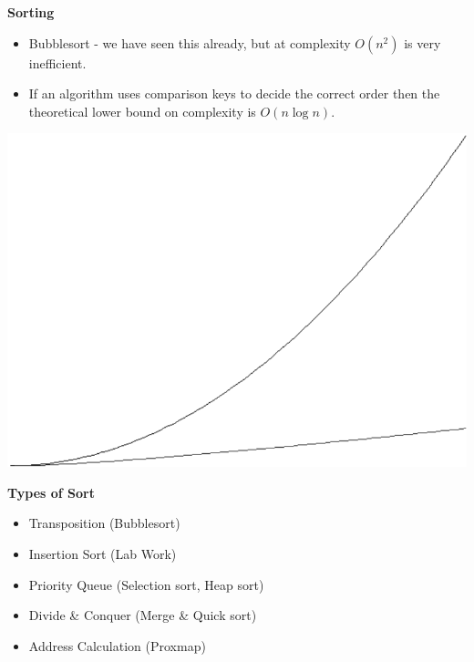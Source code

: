 \documentclass[a4,portraitt]{slides}
\begin{document}
\newpage
{\samepage
\begin{center}
{\Large{\bf Sorting}}
\end{center}
\begin{itemize}
\item Bubblesort - we have seen this already, but at complexity $O(n^2)$ is
very inefficient.
\item If an algorithm uses comparison keys to decide the correct order
then the theoretical lower bound on complexity is $O(n \log n )$.
\end{itemize}
\begin{center}
\includegraphics{../Images/nlogn.pdf}
\end{center}

}

\newpage
{\samepage
\begin{center}
{\Large{\bf Types of Sort}}
\end{center}
\begin{itemize}
\item Transposition (Bubblesort)
\item Insertion Sort (Lab Work)
\item Priority Queue (Selection sort, Heap sort)
\item Divide \& Conquer (Merge \& Quick sort)
\item Address Calculation (Proxmap)
\end{itemize}
}
\end{document}
